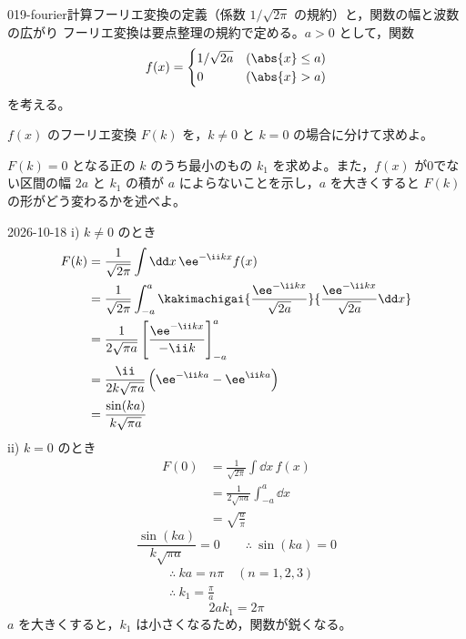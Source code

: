 \documentclass[uplatex,dvipdfmx,a4paper,11pt]{jsarticle}
\begin{document}
\begin{kirokuichiran}
\end{kirokuichiran}

\mondaihen
{}
\begin{mondai}{019-fourier}{計算}{フーリエ変換の定義（係数 $1/\sqrt{2\pi}$ の規約）と，関数の幅と波数の広がり}
フーリエ変換は要点整理の規約で定める。$a>0$ として，関数
  \[
    f(x)=
    \begin{cases}
      1/\sqrt{2a} & (\abs{x}\le a)\\
      0 & (\abs{x}>a)
    \end{cases}
  \]
  を考える。
  \begin{shoumon}
    \item $f(x)$ のフーリエ変換 $F(k)$ を，$k\neq0$ と $k=0$ の場合に分けて求めよ。
    \item $F(k)=0$ となる正の $k$ のうち最小のもの $k_{1}$ を求めよ。また，$f(x)$ が0でない区間の幅 $2a$ と $k_{1}$ の積が $a$ によらないことを示し，$a$ を大きくすると $F(k)$ の形がどう変わるかを述べよ。
  \end{shoumon}
\begin{kotaeutsushi}{2026-10-18}
i) $k\neq0$ のとき
\begin{align*}
F(k)&=\frac{1}{\sqrt{2\pi}}\int\dd x\,\ee^{-\ii kx}f(x)\\
&=\frac{1}{\sqrt{2\pi}}\int_{-a}^{a}\kakimachigai{\frac{\ee^{-\ii kx}}{\sqrt{2a}}}{\frac{\ee^{-\ii kx}}{\sqrt{2a}}\dd x}\\
&=\frac{1}{2\sqrt{\pi a}}\left[\frac{\ee^{-\ii kx}}{-\ii k}\right]_{-a}^{a}\\
&=\frac{\ii}{2k\sqrt{\pi a}}\left(\ee^{-\ii ka}-\ee^{\ii ka}\right)\\
&=\frac{\sin(ka)}{k\sqrt{\pi a}}
\end{align*}
ii) $k=0$ のとき
\begin{align*}
F(0)&=\frac{1}{\sqrt{2\pi}}\int\dd x\,f(x)\\
&=\frac{1}{2\sqrt{\pi a}}\int_{-a}^{a}\dd x\\
&=\sqrt{\frac{a}{\pi}}
\end{align*}
\[ \frac{\sin(ka)}{k\sqrt{\pi a}}=0\qquad\therefore\ \sin(ka)=0 \]
\begin{align*}
&\therefore\ ka=n\pi\quad(n=1,2,3)\\
&\therefore\ k_{1}=\frac{\pi}{a}
\end{align*}
\[ 2ak_{1}=2\pi \]
$a$ を大きくすると，$k_{1}$ は小さくなるため，関数が鋭くなる。


\end{kotaeutsushi}
\end{mondai}
\end{document}
